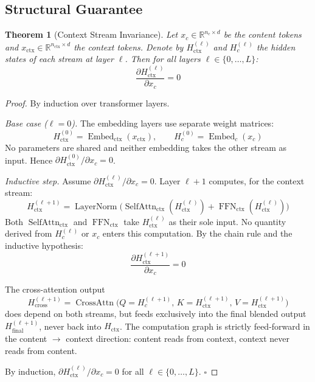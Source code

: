 \documentclass[11pt,a4paper]{article}
\newtheorem{theorem}{Theorem}[section]
\theoremstyle{definition}
\DeclareMathOperator{\LayerNorm}{LayerNorm}
\DeclareMathOperator{\SelfAttn}{SelfAttn}
\DeclareMathOperator{\CrossAttn}{CrossAttn}
\DeclareMathOperator{\FFN}{FFN}
\DeclareMathOperator{\Embed}{Embed}
\begin{document}
\subsection{Structural Guarantee}

\begin{theorem}[Context Stream Invariance]\label{thm:invariance}
Let $x_c \in \mathbb{R}^{n_c \times d}$ be the content tokens and $x_{\text{ctx}} \in \mathbb{R}^{n_{\text{ctx}} \times d}$ the context tokens. Denote by $H_{\text{ctx}}^{(\ell)}$ and $H_c^{(\ell)}$ the hidden states of each stream at layer $\ell$. Then for all layers $\ell \in \{0, \ldots, L\}$:
\begin{equation}
  \frac{\partial H_{\text{ctx}}^{(\ell)}}{\partial x_c} = 0
\end{equation}
\end{theorem}

\begin{proof}
By induction over transformer layers.

\noindent\textit{Base case ($\ell = 0$).} The embedding layers use separate weight matrices:
\begin{equation}
  H_{\text{ctx}}^{(0)} = \Embed_{\text{ctx}}(x_{\text{ctx}}), \qquad
  H_c^{(0)} = \Embed_c(x_c)
\end{equation}
No parameters are shared and neither embedding takes the other stream as input. Hence $\partial H_{\text{ctx}}^{(0)} / \partial x_c = 0$.

\noindent\textit{Inductive step.} Assume $\partial H_{\text{ctx}}^{(\ell)} / \partial x_c = 0$. Layer $\ell+1$ computes, for the context stream:
\begin{equation}
  H_{\text{ctx}}^{(\ell+1)} = \LayerNorm\!\big(
    \SelfAttn_{\text{ctx}}(H_{\text{ctx}}^{(\ell)}) +
    \FFN_{\text{ctx}}(H_{\text{ctx}}^{(\ell)})
  \big)
\end{equation}
Both $\SelfAttn_{\text{ctx}}$ and $\FFN_{\text{ctx}}$ take $H_{\text{ctx}}^{(\ell)}$ as their sole input. No quantity derived from $H_c^{(\ell)}$ or $x_c$ enters this computation. By the chain rule and the inductive hypothesis:
\begin{equation}
  \frac{\partial H_{\text{ctx}}^{(\ell+1)}}{\partial x_c} = 0
\end{equation}

The cross-attention output
\begin{equation}
  H_{\text{cross}}^{(\ell+1)} = \CrossAttn\big(Q=H_c^{(\ell+1)},\,
    K=H_{\text{ctx}}^{(\ell+1)},\,
    V=H_{\text{ctx}}^{(\ell+1)}\big)
\end{equation}
does depend on both streams, but feeds exclusively into the final blended output $H_{\text{final}}^{(\ell+1)}$, never back into $H_{\text{ctx}}$. The computation graph is strictly feed-forward in the content $\to$ context direction: content reads from context, context never reads from content.

By induction, $\partial H_{\text{ctx}}^{(\ell)} / \partial x_c = 0$ for all $\ell \in \{0, \ldots, L\}$. \hfill $\square$
\end{proof}
\end{document}

